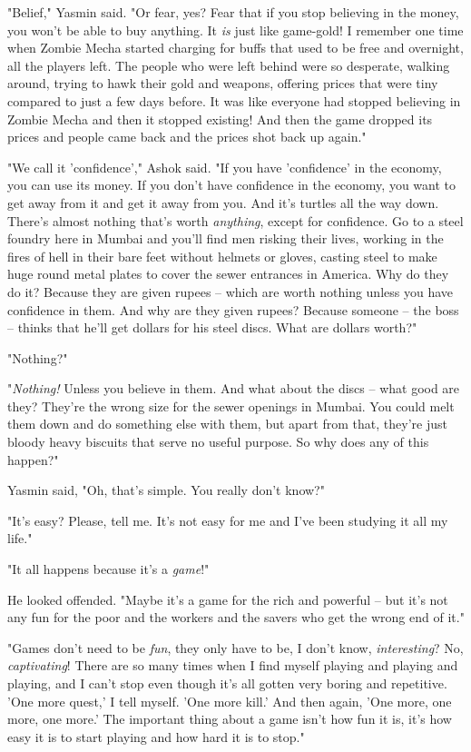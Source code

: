 "Belief," Yasmin said. "Or fear, yes? Fear that if you stop
believing in the money, you won't be able to buy anything. It
\emph{is} just like game-gold! I remember one time when Zombie
Mecha started charging for buffs that used to be free and
overnight, all the players left. The people who were left behind
were so desperate, walking around, trying to hawk their gold and
weapons, offering prices that were tiny compared to just a few days
before. It was like everyone had stopped believing in Zombie Mecha
and then it stopped existing! And then the game dropped its prices
and people came back and the prices shot back up again."

"We call it 'confidence'," Ashok said. "If you have 'confidence' in
the economy, you can use its money. If you don't have confidence in
the economy, you want to get away from it and get it away from you.
And it's turtles all the way down. There's almost nothing that's
worth \emph{anything}, except for confidence. Go to a steel foundry
here in Mumbai and you'll find men risking their lives, working in
the fires of hell in their bare feet without helmets or gloves,
casting steel to make huge round metal plates to cover the sewer
entrances in America. Why do they do it? Because they are given
rupees -- which are worth nothing unless you have confidence in
them. And why are they given rupees? Because someone -- the boss --
thinks that he'll get dollars for his steel discs. What are dollars
worth?"

"Nothing?"

"\emph{Nothing!} Unless you believe in them. And what about the
discs -- what good are they? They're the wrong size for the sewer
openings in Mumbai. You could melt them down and do something else
with them, but apart from that, they're just bloody heavy biscuits
that serve no useful purpose. So why does any of this happen?"

Yasmin said, "Oh, that's simple. You really don't know?"

"It's easy? Please, tell me. It's not easy for me and I've been
studying it all my life."

"It all happens because it's a \emph{game}!"

He looked offended. "Maybe it's a game for the rich and powerful --
but it's not any fun for the poor and the workers and the savers
who get the wrong end of it."

"Games don't need to be \emph{fun}, they only have to be, I don't
know, \emph{interesting}? No, \emph{captivating}! There are so many
times when I find myself playing and playing and playing, and I
can't stop even though it's all gotten very boring and repetitive.
'One more quest,' I tell myself. 'One more kill.' And then again,
'One more, one more, one more.' The important thing about a game
isn't how fun it is, it's how easy it is to start playing and how
hard it is to stop."

